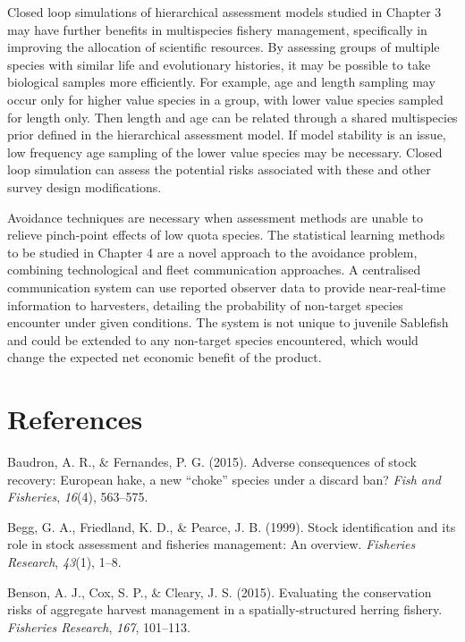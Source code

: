 \documentclass[12pt,]{scrartcl}
\begin{document}
Closed loop simulations of hierarchical assessment models studied in
Chapter 3 may have further benefits in multispecies fishery management,
specifically in improving the allocation of scientific resources. By
assessing groups of multiple species with similar life and evolutionary
histories, it may be possible to take biological samples more
efficiently. For example, age and length sampling may occur only for
higher value species in a group, with lower value species sampled for
length only. Then length and age can be related through a shared
multispecies prior defined in the hierarchical assessment model. If
model stability is an issue, low frequency age sampling of the lower
value species may be necessary. Closed loop simulation can assess the
potential risks associated with these and other survey design
modifications.

Avoidance techniques are necessary when assessment methods are unable to
relieve pinch-point effects of low quota species. The statistical
learning methods to be studied in Chapter 4 are a novel approach to the
avoidance problem, combining technological and fleet communication
approaches. A centralised communication system can use reported observer
data to provide near-real-time information to harvesters, detailing the
probability of non-target species encounter under given conditions. The
system is not unique to juvenile Sablefish and could be extended to any
non-target species encountered, which would change the expected net
economic benefit of the product.

\section*{References}
\setlength{\parindent}{-0.2in}
\singlespacing
\small
\setlength{\leftskip}{0.2in}
\setlength{\parskip}{8pt}
\vspace*{-0.4in}
\noindent

\hypertarget{refs}{}
\hypertarget{ref-baudron2015adverse}{}
Baudron, A. R., \& Fernandes, P. G. (2015). Adverse consequences of
stock recovery: European hake, a new ``choke'' species under a discard
ban? \emph{Fish and Fisheries}, \emph{16}(4), 563--575.

\hypertarget{ref-begg1999stock}{}
Begg, G. A., Friedland, K. D., \& Pearce, J. B. (1999). Stock
identification and its role in stock assessment and fisheries
management: An overview. \emph{Fisheries Research}, \emph{43}(1), 1--8.

\hypertarget{ref-benson2015evaluating}{}
Benson, A. J., Cox, S. P., \& Cleary, J. S. (2015). Evaluating the
conservation risks of aggregate harvest management in a
spatially-structured herring fishery. \emph{Fisheries Research},
\emph{167}, 101--113.
\end{document}
